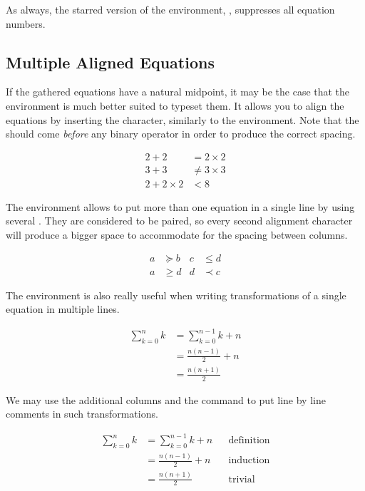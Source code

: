 As always, the starred version of the environment, , suppresses
all equation numbers.

\subsection{Multiple Aligned Equations}

If the gathered equations have a natural midpoint, it may be the case that the
 environment is much better suited to typeset them. It allows you to
align the equations by inserting the \ai{\&} character, similarly to the
 environment. Note that the \ai{\&} should come \emph{before} any
binary operator in order to produce the correct spacing.
\begin{example}
\begin{align}
  2 + 2 & = 2 \times 2 \\
  3 + 3 & \neq 3 \times 3 \\
  2 + 2 \times 2 & < 8
\end{align}
\end{example}

The environment allows to put more than one equation in a single line by
using several \ai{\&}. They are considered to be paired, so every second
alignment character will produce a bigger space to accommodate for the spacing
between columns.
\begin{example}
\begin{align}
  a & \succeq b & c & \leq d \\
  a & \geq d & d & \prec c
\end{align}
\end{example}

The  environment is also really useful when writing transformations of
a single equation in multiple lines.
\begin{example}
\begin{align}
  \sum_{k=0}^n k 
    &= \sum_{k=0}^{n-1} k + n \\
    &= \frac{n(n-1)}{2} + n \\
    &= \frac{n(n+1)}{2}
\end{align}
\end{example}
We may use the additional columns and the  command to put line by
line comments in such transformations.
\begin{example}
\begin{align*}
  \sum_{k=0}^n k
    &= \sum_{k=0}^{n-1} k + n
      && \text{definition} \\
    &= \frac{n(n - 1)}{2} + n
      && \text{induction} \\
    &= \frac{n(n + 1)}{2}
      && \text{trivial}
\end{align*}
\end{example}

